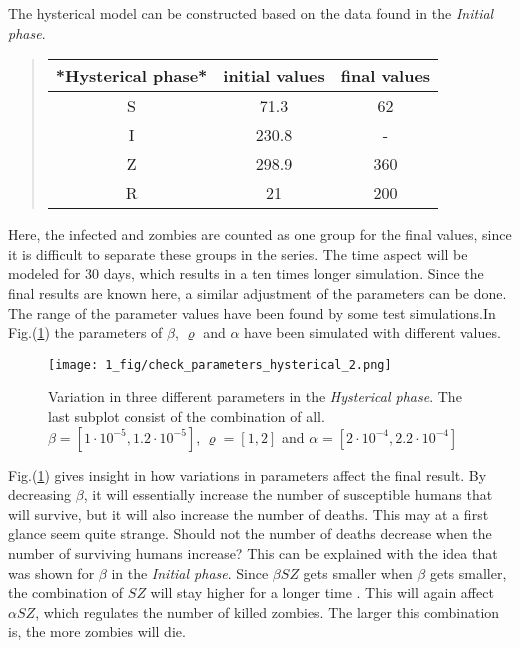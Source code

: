 \documentclass[%
twoside,                 %
final,                   %
chapterprefix=true,      %
open=right               %
10pt]{book}
\begin{document}
\vspace{3mm}




\vspace{3mm}


The hysterical model can be constructed based on the data found in the \emph{Initial phase}. 


\begin{quote}
\begin{tabular}{ccc}
\hline
\multicolumn{1}{c}{ *Hysterical phase* } & \multicolumn{1}{c}{ initial values } & \multicolumn{1}{c}{ final values } \\
\hline
S                  & 71.3           & 62           \\
I                  & 230.8          & -            \\
Z                  & 298.9          & 360          \\
R                  & 21             & 200          \\
\hline
\end{tabular}
\end{quote}

\noindent
Here, the infected and zombies are counted as one group for the final values, since it is difficult to separate these groups in the series. The time aspect will be modeled for 30 days, which results in a ten times longer simulation. Since the final results are known here, a similar adjustment of the parameters can be done. The range of the parameter values have been found by some test simulations.In Fig.(\ref{fig:hysterical_variations}) the parameters of $\beta$, $\varrho$ and $\alpha$ have been simulated with different values. 


\begin{figure}[ht]
  \centerline{\texttt{[image: 1\_fig/check\_parameters\_hysterical\_2.png]}}
  \caption{
  \label{fig:hysterical_variations} Variation in three different parameters in the \emph{Hysterical phase}. The last subplot consist of the combination of all. $\beta=[1\cdot10^{-5},1.2\cdot10^{-5}]$, $\varrho=[1,2]$ and $\alpha=[2\cdot10^{-4},2.2\cdot10^{-4}]$
  }
\end{figure}


Fig.(\ref{fig:hysterical_variations}) gives insight in how variations in parameters affect the final result. By decreasing $\beta$, it will essentially increase the number of susceptible humans that will survive, but it will also increase the number of deaths. This may at a first glance seem quite strange. Should not the number of deaths decrease when the number of surviving humans increase? This can be explained with the idea that was shown for $\beta$ in the \emph{Initial phase}. Since $\beta SZ$ gets smaller when $\beta$ gets smaller, the combination of $SZ$ will stay higher for a longer time . This will again affect $\alpha SZ$, which regulates the number of killed zombies. The larger this combination is, the more zombies will die. 
\end{document}
